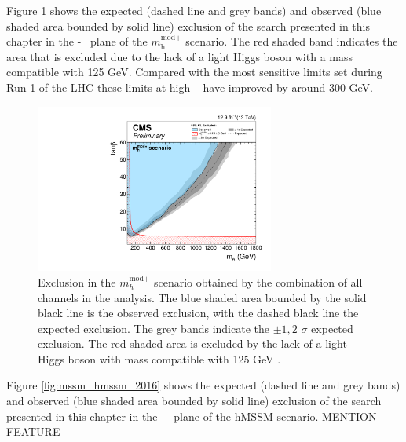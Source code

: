 Figure \ref{fig:mssm_mhmodp_2016} shows the expected (dashed line and grey bands) and
observed (blue shaded area bounded by solid line) exclusion of the search presented in this chapter
in the \mA-\tanb~ plane of the $m_{\text{h}}^{\text{mod+}}$ scenario. The red shaded band
indicates the area that is excluded due to the lack of a light Higgs boson with a mass compatible
with 125 GeV. Compared with the most sensitive limits set during Run 1 of the \ac{LHC} these
limits at high \tanb~ have improved by around 300 GeV.

\begin{figure}[h!]
\begin{center}
\includegraphics[width=0.7\textwidth]{./MSSM/Figures/CMS-PAS-HIG-16-037_Figure_012-a.pdf}
\end{center}
\caption{Exclusion in the $m_{h}^{\text{mod}+}$ scenario obtained by the combination
of all channels in the \AHtotautau analysis. The blue shaded area bounded by the 
solid black line is the observed exclusion, with the dashed black line the
expected exclusion. The grey bands indicate the $\pm 1,2$ $\sigma$ 
expected exclusion. The red shaded area
is excluded by the lack of a light Higgs boson with mass compatible with 125 GeV \cite{CMS-PAS-HIG-16-037}.}
\label{fig:mssm_mhmodp_2016}
\end{figure}

Figure \ref{fig:mssm_hmssm_2016} shows the expected (dashed line and grey bands)
and observed (blue shaded area bounded by solid line) exclusion of the search
presented in this chapter in the \mA-\tanb~ plane of the hMSSM scenario. 
MENTION FEATURE

